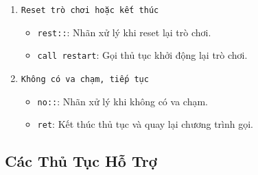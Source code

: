 \documentclass[12pt]{article}
\begin{document}
\begin{enumerate}[label=\textbf{\arabic*.}]
    \item \texttt{Reset trò chơi hoặc kết thúc}
    \begin{itemize}
        \item \texttt{rest::}: Nhãn xử lý khi reset lại trò chơi.
        \item \texttt{call restart}: Gọi thủ tục khởi động lại trò chơi.
    \end{itemize}

    \item \texttt{Không có va chạm, tiếp tục}
    \begin{itemize}
        \item \texttt{no::}: Nhãn xử lý khi không có va chạm.
        \item \texttt{ret}: Kết thúc thủ tục và quay lại chương trình gọi.
    \end{itemize}
\end{enumerate}




\subsection*{Các Thủ Tục Hỗ Trợ}
\end{document}
